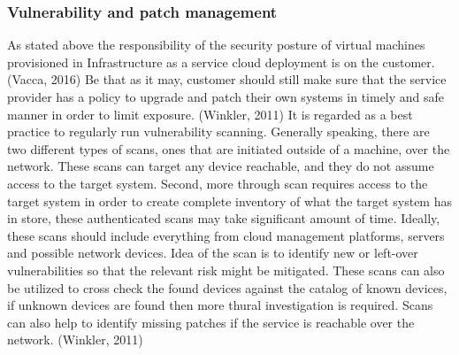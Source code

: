 \documentclass{article}
\begin{document}
\subsubsection{Vulnerability and patch management}
As stated above the responsibility of the security posture of virtual machines provisioned in Infrastructure as a service cloud deployment is on the customer. (Vacca, 2016) Be that as it may, customer should still make sure that the service provider has a policy to upgrade and patch their own systems in timely and safe manner in order to limit exposure. (Winkler, 2011)
It is regarded as a best practice to regularly run vulnerability scanning. Generally speaking, there are two different types of scans, ones that are initiated outside of a machine, over the network. These scans can target any device reachable, and they do not assume access to the target system. Second, more through scan requires access to the target system in order to create complete inventory of what the target system has in store, these authenticated scans may take significant amount of time. Ideally, these scans should include everything from cloud management platforms, servers and possible network devices. Idea of the scan is to identify new or left-over vulnerabilities so that the relevant risk might be mitigated. These scans can also be utilized to cross check the found devices against the catalog of known devices, if unknown devices are found then more thural investigation is required. Scans can also help to identify missing patches if the service is reachable over the network. (Winkler, 2011)
\end{document}

